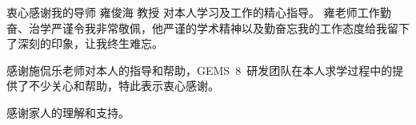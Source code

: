
\begin{ack}

  衷心感谢我的导师 雍俊海 教授 对本人学习及工作的精心指导。
  雍老师工作勤奋、治学严谨令我非常敬佩，他严谨的学术精神以及勤奋忘我的工作态度给我留下了深刻的印象，让我终生难忘。
  
  感谢施侃乐老师对本人的指导和帮助，GEMS~8~研发团队在本人求学过程中的提供了不少关心和帮助，特此表示衷心感谢。

  感谢家人的理解和支持。

\end{ack}
